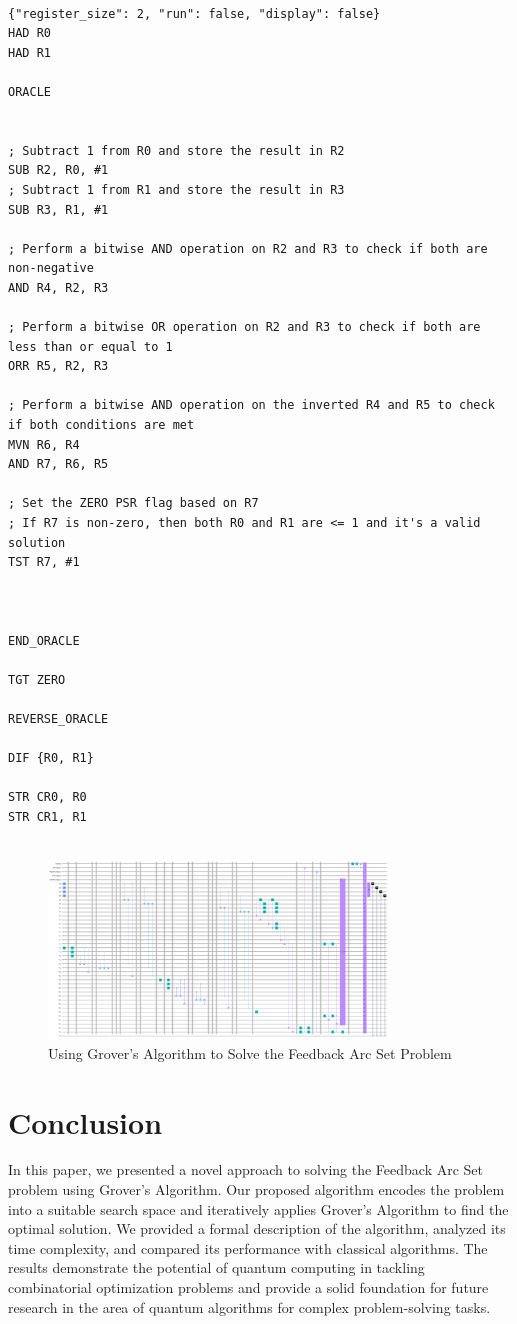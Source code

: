 \begin{lstlisting}

{"register_size": 2, "run": false, "display": false}
HAD R0
HAD R1

ORACLE


; Subtract 1 from R0 and store the result in R2
SUB R2, R0, #1
; Subtract 1 from R1 and store the result in R3
SUB R3, R1, #1

; Perform a bitwise AND operation on R2 and R3 to check if both are non-negative
AND R4, R2, R3

; Perform a bitwise OR operation on R2 and R3 to check if both are less than or equal to 1
ORR R5, R2, R3

; Perform a bitwise AND operation on the inverted R4 and R5 to check if both conditions are met
MVN R6, R4
AND R7, R6, R5

; Set the ZERO PSR flag based on R7
; If R7 is non-zero, then both R0 and R1 are <= 1 and it's a valid solution
TST R7, #1



END_ORACLE

TGT ZERO

REVERSE_ORACLE

DIF {R0, R1}

STR CR0, R0
STR CR1, R1


\end{lstlisting}

\begin{figure}[htp]
    \centering
    \includegraphics[width=9cm]{Figures/Feedback_Arc_Set_circuit.png}
    \caption{Using Grover's Algorithm to Solve the Feedback Arc Set Problem}
    \label{fig:Feedback_Arc_Set}
\end{figure}

\section{Conclusion}
\label{sec:conclusion}
In this paper, we presented a novel approach to solving the Feedback Arc Set problem using Grover's Algorithm. Our proposed algorithm encodes the problem into a suitable search space and iteratively applies Grover's Algorithm to find the optimal solution. We provided a formal description of the algorithm, analyzed its time complexity, and compared its performance with classical algorithms. The results demonstrate the potential of quantum computing in tackling combinatorial optimization problems and provide a solid foundation for future research in the area of quantum algorithms for complex problem-solving tasks.

